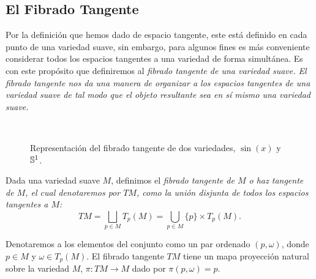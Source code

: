 \subsection{El Fibrado Tangente}\label{Subsección: Fibrado Tangente}
Por la definición que hemos dado de espacio tangente, este está definido en cada punto de una variedad suave, sin embargo, para algunos fines es más conveniente considerar todos los espacios tangentes a una variedad de forma simultánea. Es con este propósito que definiremos al \it{fibrado tangente} de una variedad suave. El fibrado tangente nos da una manera de organizar a los espacios tangentes de una variedad suave de tal modo que el objeto resultante sea en sí mismo una variedad suave.
\begin{center}
	\begin{figure}[h!]
		\centering
		\begin{subfigure}{0.35\textwidth}
			\centering
			
		\end{subfigure}
		\hspace{40pt}
		\begin{subfigure}{0.35\textwidth}
			\centering
			
		\end{subfigure}
		\\[20pt]
		\begin{subfigure}{0.35\textwidth}
			\centering
			
		\end{subfigure}
		\hspace{30pt}
		\begin{subfigure}{0.35\textwidth}
			\centering
			
		\end{subfigure}
		\caption{Representación del fibrado tangente de dos variedades, $\sin(x)$ y $\S^{1}$.}
	\end{figure}
\end{center}
\begin{definition}
	Dada una variedad suave $M$, definimos el \it{fibrado tangente de $M$} o \it{haz tangente de $M$}, el cual denotaremos por $TM$, como la unión disjunta de todos los espacios tangentes a $M$:
	\[ TM = \bigsqcup_{p \in M} T_p(M) = \bigcup_{p \in M} \{p\} \times T_p(M). \]
\end{definition}

Denotaremos a los elementos del conjunto como un par ordenado $(p, \omega)$, donde $p \in M$ y $\omega \in T_p(M)$. El fibrado tangente $TM$ tiene un mapa proyección natural sobre la variedad $M$, $\pi: TM \to M$ dado por $\pi(p,\omega)=p$.


